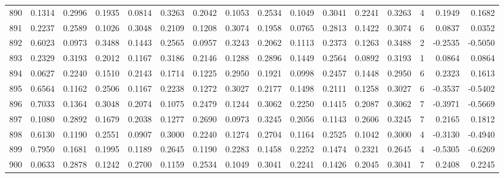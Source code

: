 \begin{tabular}{lrrrrrrrrrrrrrrr}
890 &      0.1314 &  0.2996 &  0.1935 &  0.0814 &  0.3263 &  0.2042 &  0.1053 &  0.2534 &  0.1049 &  0.3041 &   0.2241 &     0.3263 &      4 &                    0.1949 &                     0.1682 \\
891 &      0.2237 &  0.2589 &  0.1026 &  0.3048 &  0.2109 &  0.1208 &  0.3074 &  0.1958 &  0.0765 &  0.2813 &   0.1422 &     0.3074 &      6 &                    0.0837 &                     0.0352 \\
892 &      0.6023 &  0.0973 &  0.3488 &  0.1443 &  0.2565 &  0.0957 &  0.3243 &  0.2062 &  0.1113 &  0.2373 &   0.1263 &     0.3488 &      2 &                   -0.2535 &                    -0.5050 \\
893 &      0.2329 &  0.3193 &  0.2012 &  0.1167 &  0.3186 &  0.2146 &  0.1288 &  0.2896 &  0.1449 &  0.2564 &   0.0892 &     0.3193 &      1 &                    0.0864 &                     0.0864 \\
894 &      0.0627 &  0.2240 &  0.1510 &  0.2143 &  0.1714 &  0.1225 &  0.2950 &  0.1921 &  0.0998 &  0.2457 &   0.1448 &     0.2950 &      6 &                    0.2323 &                     0.1613 \\
895 &      0.6564 &  0.1162 &  0.2506 &  0.1167 &  0.2238 &  0.1272 &  0.3027 &  0.2177 &  0.1498 &  0.2111 &   0.1258 &     0.3027 &      6 &                   -0.3537 &                    -0.5402 \\
896 &      0.7033 &  0.1364 &  0.3048 &  0.2074 &  0.1075 &  0.2479 &  0.1244 &  0.3062 &  0.2250 &  0.1415 &   0.2087 &     0.3062 &      7 &                   -0.3971 &                    -0.5669 \\
897 &      0.1080 &  0.2892 &  0.1679 &  0.2038 &  0.1277 &  0.2690 &  0.0973 &  0.3245 &  0.2056 &  0.1143 &   0.2606 &     0.3245 &      7 &                    0.2165 &                     0.1812 \\
898 &      0.6130 &  0.1190 &  0.2551 &  0.0907 &  0.3000 &  0.2240 &  0.1274 &  0.2704 &  0.1164 &  0.2525 &   0.1042 &     0.3000 &      4 &                   -0.3130 &                    -0.4940 \\
899 &      0.7950 &  0.1681 &  0.1995 &  0.1189 &  0.2645 &  0.1190 &  0.2283 &  0.1458 &  0.2252 &  0.1474 &   0.2321 &     0.2645 &      4 &                   -0.5305 &                    -0.6269 \\
900 &      0.0633 &  0.2878 &  0.1242 &  0.2700 &  0.1159 &  0.2534 &  0.1049 &  0.3041 &  0.2241 &  0.1426 &   0.2045 &     0.3041 &      7 &                    0.2408 &                     0.2245 \\

\end{tabular}
